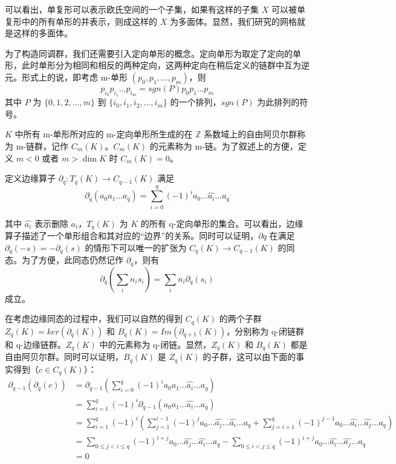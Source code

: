可以看出，单复形可以表示欧氏空间的一个子集，如果有这样的子集 $ X $ 可以被单复形中的所有单形的并表示，则成这样的 $ X $ 为多面体。显然，我们研究的网格就是这样的多面体。

为了构造同调群，我们还需要引入定向单形的概念。定向单形为取定了定向的单形，此时单形分为相同和相反的两种定向，这两种定向在稍后定义的链群中互为逆元。形式上的说，即考虑 m-单形 $ (p_0, p_1, \dots, p_m) $，则 
$$ p_{i_0} p_{i_1} \dots p_{i_m} = sgn(P) p_{0} p_{1} \dots p_{m} $$
其中 $ P $ 为 $ \{0, 1, 2, \dots, m \} $ 到 $ \{i_0, i_1, i_2, \dots, i_m \} $ 的一个排列，$ sgn(P) $ 为此排列的符号。

$ K $ 中所有 m-单形所对应的 m-定向单形所生成的在 $ \mathbb{Z} $ 系数域上的自由阿贝尔群称为 m-链群，记作 $ C_m(K) $。$ C_m(K) $ 的元素称为 m-链。为了叙述上的方便，定义 $ m < 0 $ 或者 $ m > \dim K $ 时 $ C_m(K) = 0 $。

定义边缘算子 $ \partial_q: T_q(K) \to C_{q-1}(K) $ 满足 
$$ \partial_q (a_0 a_1 \dots a_q) = \sum_{i=0}^{q} (-1)^i a_0 \dots \hat{a_i} \dots a_q $$

其中  $ \hat{a_i} $ 表示删除 $ a_i $，$ T_q(K) $ 为 $ K $ 的所有 q-定向单形的集合。可以看出，边缘算子描述了一个单形组合和其对应的“边界”的关系。同时可以证明，$ \partial q $ 在满足 $\partial_q(-s) = -\partial_q(s) $ 的情形下可以唯一的扩张为 $ C_q(K) \to C_{q-1}(K) $ 的同态。为了方便，此同态仍然记作 $ \partial_q $，则有
$$
\partial_q (\sum_i n_i s_i) = \sum_i n_i \partial_q (s_i)
$$
成立。

在考虑边缘同态的过程中，我们可以自然的得到 $ C_q(K) $ 的两个子群 $ Z_q(K) = ker(\partial_q(K)) $ 和 $ B_q(K) = Im(\partial_{q+1}(K)) $，分别称为 q-闭链群和 q-边缘链群。$ Z_q(K) $ 中的元素称为 q-闭链。显然，$ Z_q(K) $ 和 $ B_q(K) $ 都是自由阿贝尔群。同时可以证明，$ B_q(K) $ 是 $ Z_q(K) $ 的子群，这可以由下面的事实得到（$ c \in C_q(K) $）：
\begin{align*}
\partial_{q-1} (\partial_q (c)) &= \partial_{q-1} (\sum_{i=0}^q (-1)^i a_0 a_1 \dots \hat{a_i} \dots a_q) \\
&= \sum_{i=1}^q (-1)^i \partial_{q-1} (a_0 a_1 \dots \hat{a_i} \dots a_q) \\
&= \sum_{i=1}^q (-1)^i ( \sum_{j=1}^{i-1} (-1)^j a_0 \dots \hat{a_j} \dots \hat{a_i} \dots a_q + \sum_{j=i+1}^{q} (-1)^{j-1} a_0 \dots \hat{a_i} \dots \hat{a_j} \dots a_q ) \\
&= \sum_{0 \le j < i \le q} (-1)^{i+j} a_0 \dots \hat{a_j} \dots \hat{a_i} \dots a_q - \sum_{0 \le i < j \le q} (-1)^{i+j} a_0 \dots \hat{a_i} \dots \hat{a_j} \dots a_q \\
&= 0
\end{align*}

